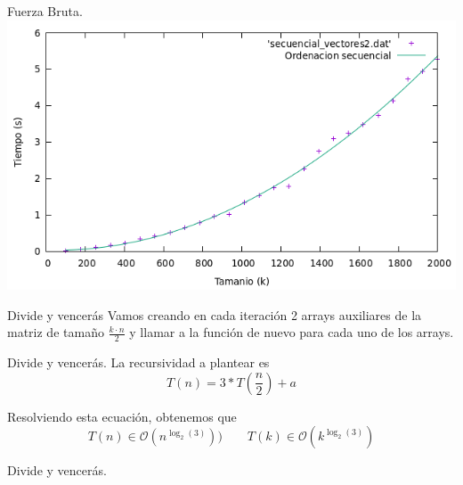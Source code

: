 \documentclass[10pt, xcolor=table]{beamer}
\begin{document}
\begin{frame}[fragile]{Fuerza Bruta. }
\centering
\includegraphics[scale=0.35]{./Images/Grafica_eje2_fijonsec.png}
\end{frame}

\begin{frame}[fragile]{Divide y vencerás}
Vamos creando en cada iteración 2 arrays auxiliares de la matriz de tamaño \(\frac{k \cdot n }{2}\) y llamar a la función de nuevo para cada uno de los arrays.
\end{frame}

\begin{frame}[fragile]{Divide y vencerás. }
La recursividad a plantear es 
\[
	T(n) = 3 * T \left( \frac{n}{2} \right) + a
\]

Resolviendo esta ecuación, obtenemos que 
\[
	T(n) \in \mathcal{O} (n^{\log_2(3)})) \qquad T(k) \in \mathcal{O}(k^{\log_2(3)})
\]
\end{frame}

\begin{frame}[fragile]{Divide y vencerás. }
\begin{table}[h!]
  	\centering
  	\footnotesize
  \end{table}
\end{frame}
\end{document}

